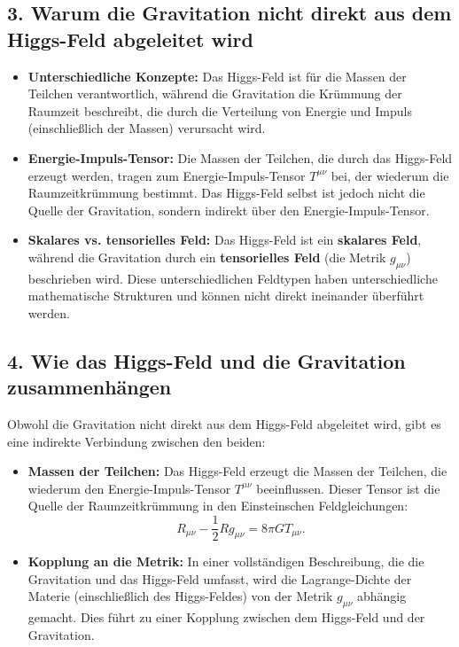\documentclass{article}
\begin{document}
	\subsection{3. Warum die Gravitation nicht direkt aus dem Higgs-Feld abgeleitet wird}
	
	\begin{itemize}
		\item \textbf{Unterschiedliche Konzepte:} Das Higgs-Feld ist für die Massen der Teilchen verantwortlich, während die Gravitation die Krümmung der Raumzeit beschreibt, die durch die Verteilung von Energie und Impuls (einschließlich der Massen) verursacht wird.
		\item \textbf{Energie-Impuls-Tensor:} Die Massen der Teilchen, die durch das Higgs-Feld erzeugt werden, tragen zum Energie-Impuls-Tensor $T^{\mu\nu}$ bei, der wiederum die Raumzeitkrümmung bestimmt. Das Higgs-Feld selbst ist jedoch nicht die Quelle der Gravitation, sondern indirekt über den Energie-Impuls-Tensor.
		\item \textbf{Skalares vs. tensorielles Feld:} Das Higgs-Feld ist ein \textbf{skalares Feld}, während die Gravitation durch ein \textbf{tensorielles Feld} (die Metrik $g_{\mu\nu}$) beschrieben wird. Diese unterschiedlichen Feldtypen haben unterschiedliche mathematische Strukturen und können nicht direkt ineinander überführt werden.
	\end{itemize}
	
	\subsection{4. Wie das Higgs-Feld und die Gravitation zusammenhängen}
	
	Obwohl die Gravitation nicht direkt aus dem Higgs-Feld abgeleitet wird, gibt es eine indirekte Verbindung zwischen den beiden:
	
	\begin{itemize}
		\item \textbf{Massen der Teilchen:} Das Higgs-Feld erzeugt die Massen der Teilchen, die wiederum den Energie-Impuls-Tensor $T^{\mu\nu}$ beeinflussen. Dieser Tensor ist die Quelle der Raumzeitkrümmung in den Einsteinschen Feldgleichungen:
		\[
		R_{\mu\nu} - \frac{1}{2} R g_{\mu\nu} = 8\pi G T_{\mu\nu}.
		\]
		\item \textbf{Kopplung an die Metrik:} In einer vollständigen Beschreibung, die die Gravitation und das Higgs-Feld umfasst, wird die Lagrange-Dichte der Materie (einschließlich des Higgs-Feldes) von der Metrik $g_{\mu\nu}$ abhängig gemacht. Dies führt zu einer Kopplung zwischen dem Higgs-Feld und der Gravitation.
	\end{itemize}
	
\end{document}
